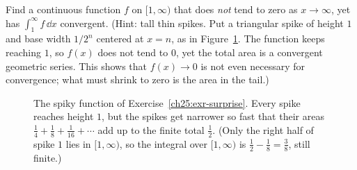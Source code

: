 \begin{exercise}
\label{ch25:exr-surprise}
Find a continuous function $f$ on $[1,\infty)$ that does \emph{not} tend to zero
as $x\to\infty$, yet has $\int_1^\infty f\,\dd x$ convergent.
(Hint: tall thin spikes. Put a triangular spike of height $1$ and base width
$1/2^n$ centered at $x=n$, as in Figure~\ref{ch25:fig-spikes}. The function keeps
reaching $1$, so $f(x)$ does not tend to $0$, yet the total area is a convergent
geometric series. This shows that $f(x)\to0$ is not even necessary for
convergence; what must shrink to zero is the area in the tail.)

\begin{figure}[htbp]
\centering
{}
\caption{The spiky function of Exercise~\ref{ch25:exr-surprise}. Every spike reaches
height $1$, but the spikes get narrower so fast that their areas
$\tfrac14 + \tfrac18 + \tfrac1{16} + \cdots$ add up to the finite total $\tfrac12$. (Only the right half of spike $1$ lies in
$[1,\infty)$, so the integral over $[1,\infty)$ is $\tfrac12 - \tfrac18 = \tfrac38$, still finite.)}
\label{ch25:fig-spikes}
\end{figure}
\end{exercise}
